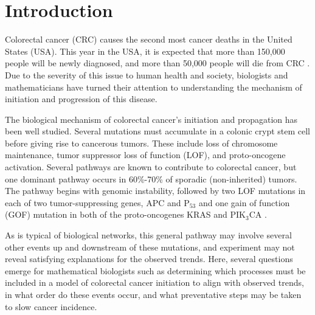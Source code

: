 \section{Introduction}

Colorectal cancer (CRC) causes the second most cancer deaths in the United States (USA). This year in the USA, it is expected that more than 150,000 people will be newly diagnosed, and more than 50,000 people will die from CRC \autocite{CancerStatistics}. Due to the severity of this issue to human health and society, biologists and mathematicians have turned their attention to understanding the mechanism of initiation and progression of this disease. 

The biological mechanism of colorectal cancer's initiation and propagation has been well studied. Several mutations must accumulate in a colonic crypt stem cell before giving rise to cancerous tumors. These include loss of chromosome maintenance, tumor suppressor loss of function (LOF), and proto-oncogene activation. 
Several pathways are known to contribute to colorectal cancer, but one dominant pathway occurs in 60\%-70\% of sporadic (non-inherited) tumors. The pathway begins with genomic instability, followed by two LOF mutations in each of two tumor-suppressing genes, APC and P$_{53}$ and one gain of function (GOF) mutation in both of the proto-oncogenes KRAS and PIK$_{3}$CA \autocite{PathwaysofCRC}.


As is typical of biological networks, this general pathway may involve several other events up and downstream of these mutations, and experiment may not reveal satisfying explanations for the observed trends.
Here, several questions emerge for mathematical biologists such as determining which processes must be included in a model of colorectal cancer initiation to align with observed trends, in what order do these events occur, and what preventative steps may be taken to slow cancer incidence.

